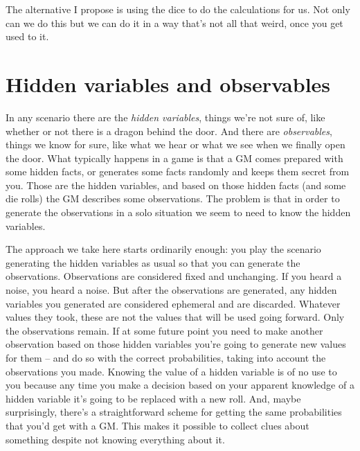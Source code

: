 \documentclass[12pt]{article}
\begin{document}
The alternative I propose is using the dice to do the calculations for
us. Not only can we do this but we can do it in a way that's not all
that weird, once you get used to it.

\hypertarget{hidden-variables-and-observables}{%
\section{Hidden variables and observables}\label{hidden-variables-and-observables}}

In any scenario there are the \emph{hidden variables}, things we're not sure
of, like whether or not there is a dragon behind the door. And there are
\emph{observables}, things we know for sure, like what we hear or what we see
when we finally open the door. What typically happens in a game is that
a GM comes prepared with some hidden facts, or generates some facts randomly
and keeps them secret from you. Those are the hidden variables, and
based on those hidden facts (and some die rolls) the GM describes some
observations. The problem is
that in order to generate the observations in a solo situation we seem
to need to know the hidden variables.

The approach we take here starts ordinarily enough: you play the scenario
generating the hidden variables as usual so that you can generate the
observations. Observations are considered fixed and unchanging. If you
heard a noise, you heard a noise. But after the observations are
generated, any hidden variables you generated are considered ephemeral
and are discarded. Whatever values they took, these are not the values
that will be used going forward. Only the observations remain. If at
some future point you need to make another observation based on those
hidden variables you're going to generate new values for them -- and
do so with the correct probabilities, taking into account the
observations you made.
Knowing the value of a hidden
variable is of no use to you because any time you make a decision based on your
apparent knowledge of a hidden variable it's going to be replaced
with a new roll. And, maybe surprisingly, there's a straightforward
scheme for getting the same probabilities that you'd get with a GM.
This makes it possible to collect clues about something despite not
knowing everything about it.
\end{document}
